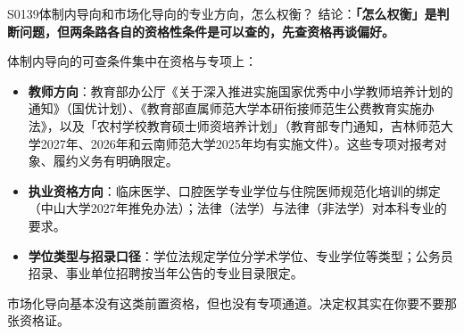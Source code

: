 \begin{qa}{S0139}{体制内导向和市场化导向的专业方向，怎么权衡？}
结论：\textbf{「怎么权衡」是判断问题，但两条路各自的资格性条件是可以查的，先查资格再谈偏好。}

体制内导向的可查条件集中在资格与专项上：
\begin{itemize}
  \item \textbf{教师方向}：教育部办公厅《关于深入推进实施国家优秀中小学教师培养计划的通知》（国优计划）、《教育部直属师范大学本研衔接师范生公费教育实施办法》，以及「农村学校教育硕士师资培养计划」（教育部专门通知，吉林师范大学2027年、2026年和云南师范大学2025年均有实施文件）。这些专项对报考对象、履约义务有明确限定。
  \item \textbf{执业资格方向}：临床医学、口腔医学专业学位与住院医师规范化培训的绑定（中山大学2027年推免办法）；法律（法学）与法律（非法学）对本科专业的要求。
  \item \textbf{学位类型与招录口径}：学位法规定学位分学术学位、专业学位等类型；公务员招录、事业单位招聘按当年公告的专业目录限定。
\end{itemize}

市场化导向基本没有这类前置资格，但也没有专项通道。决定权其实在你要不要那张资格证。
\end{qa}


